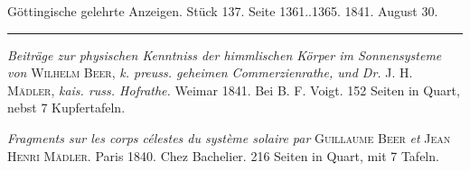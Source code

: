\clearpage
{}
\hypertarget{native-657-lower}{}
\begin{center}\small Göttingische gelehrte Anzeigen. Stück 137. Seite 1361..1365. 1841. August 30.\\[3pt]\rule{.72\linewidth}{.3pt}\end{center}

\emph{Beiträge zur physischen Kenntniss der himmlischen Körper im Sonnensysteme von} \textsc{Wilhelm Beer}, \emph{k. preuss. geheimen Commerzienrathe, und Dr.} J. H. \textsc{Mädler}, \emph{kais. russ. Hofrathe.} Weimar 1841. Bei B. F. Voigt. 152 Seiten in Quart, nebst 7 Kupfertafeln.

\emph{Fragments sur les corps célestes du système solaire par} \textsc{Guillaume Beer} \emph{et} \textsc{Jean Henri Mädler.} Paris 1840. Chez Bachelier. 216 Seiten in Quart, mit 7 Tafeln.

